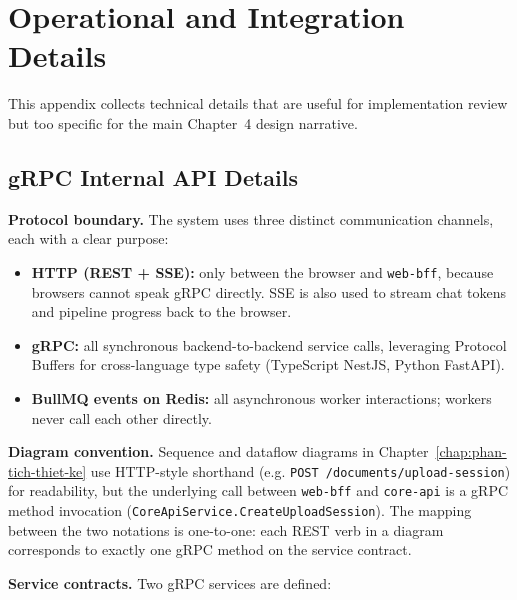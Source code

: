 \chapter{Operational and Integration Details}
\label{appendix:operational-details}

This appendix collects technical details that are useful for
implementation review but too specific for the main Chapter~4 design
narrative.

\section{gRPC Internal API Details}
\label{appendix:grpc-proto-details}

\textbf{Protocol boundary.} The system uses three distinct communication
channels, each with a clear purpose:

\begin{itemize}
    \item \textbf{HTTP (REST + SSE):} only between the browser and
          \texttt{web-bff}, because browsers cannot speak gRPC directly.
          SSE is also used to stream chat tokens and pipeline progress
          back to the browser.
    \item \textbf{gRPC:} all synchronous backend-to-backend service
          calls, leveraging Protocol Buffers for cross-language type
          safety (TypeScript NestJS, Python FastAPI).
    \item \textbf{BullMQ events on Redis:} all asynchronous worker
          interactions; workers never call each other directly.
\end{itemize}

\textbf{Diagram convention.} Sequence and dataflow diagrams in
Chapter~\ref{chap:phan-tich-thiet-ke} use HTTP-style shorthand (e.g.
\texttt{POST /documents/upload-session}) for readability, but the
underlying call between \texttt{web-bff} and \texttt{core-api} is a
gRPC method invocation
(\texttt{CoreApiService.CreateUploadSession}). The mapping between the
two notations is one-to-one: each REST verb in a diagram corresponds
to exactly one gRPC method on the service contract.

\textbf{Service contracts.} Two gRPC services are defined:

